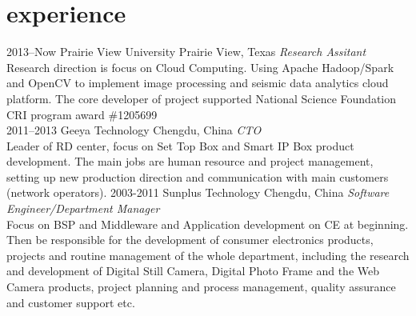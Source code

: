 \documentclass[]{friggeri-cv} %
\begin{document}

\section{experience}

\begin{entrylist}
\entry
{2013--Now}
{Prairie View University}
{Prairie View, Texas}
{\emph{Research Assitant} \\
Research direction is focus on Cloud Computing. Using Apache Hadoop/Spark and OpenCV to implement image processing and seismic data analytics cloud platform. The core developer of project supported National Science Foundation CRI program award \#1205699 \\
}
\entry
{2011--2013}
{Geeya Technology}
{Chengdu, China}
{\emph{CTO} \\
Leader of RD center, focus on Set Top Box and Smart IP Box product development.
The main jobs are human resource and project management, setting up new production direction and communication with main customers (network operators).
}
\entry
{2003-2011}
{Sunplus Technology}
{Chengdu, China}
{\emph{Software Engineer/Department Manager} \\
Focus on BSP and Middleware and Application development on CE at beginning. Then be responsible for the development of consumer electronics products, projects and routine management of the whole department, including the research and development of Digital Still Camera, Digital Photo Frame and the Web Camera products, project planning and process management, quality assurance and customer support etc.
}
\end{entrylist}

\end{document}
